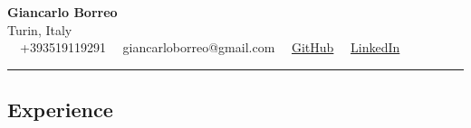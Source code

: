 \documentclass[11pt,letterpaper]{article}
\begin{document}
\begin{center}
	{\LARGE \textbf{Giancarlo Borreo}}\\
	Turin, Italy
	\vspace{0.02cm}
	\\
	\raisebox{-0.2\height}{{\small \faPhoneSquare}} \ \  +393519119291 \hfill
	\raisebox{-0.2\height}{{\small \faEnvelopeSquare}} \ \ giancarloborreo@gmail.com \hfill
	\raisebox{-0.2\height}{{\small \faGithubSquare}} \ \
	\href{https://github.com/deadman20018/}{GitHub} \hfill
	\raisebox{-0.2\height}{{\small \faLinkedinSquare}} \ \
	\href{https://www.linkedin.com/in/giancarlo-borreo-8b79101a0/}{LinkedIn}
\end{center}

\hrule
\vspace{-1em}
\subsection*{\Large Experience}
\end{document}
